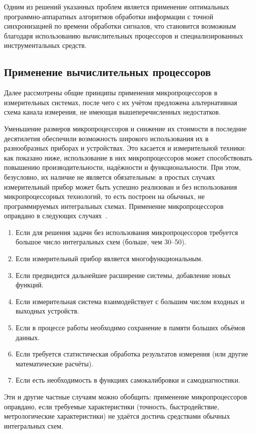 \documentclass[a4paper, 14pt, titlepage]{extarticle}
\begin{document}
  Одним из решений указанных проблем является применение оптимальных программно-аппаратных
  алгоритмов обработки информации с точной синхронизацией по времени  обработки сигналов,
  что становится возможным благодаря использованию вычислительных процессоров и специализированных инструментальных средств.

  \subsection{Применение вычислительных процессоров}

  Далее рассмотрены общие принципы применения микропроцессоров в измерительных системах, после чего
  с их учётом предложена альтернативная схема канала измерения, не имеющая вышеперечисленных недостатков.

  Уменьшение размеров микропроцессоров и снижение их стоимости в последние десятилетия обеспечили
  возможность широкого использования их в разнообразных приборах и устройствах. Это касается и
  измерительной техники: как показано ниже, использование в них микропроцессоров может
  способствовать повышению производительности, надёжности и функциональности. При этом, безусловно,
  их наличие не является обязательным: в простых случаях измерительный прибор может быть успешно реализован
  и без использования микропроцессорных технологий, то есть построен на обычных, не программируемых
  интегральных схемах. Применение микропроцессоров оправдано в следующих случаях~\cite[с.~241]{rannev-meas-tech}.
  \begin{enumerate}
    \item Если для решения задачи без использования микропроцессоров требуется большое число интегральных
      схем (больше, чем 30--50).
    \item Если измерительный прибор является многофункциональным.
    \item Если предвидится дальнейшее расширение системы, добавление новых функций.
    \item Если измерительная система взаимодействует с большим числом входных и выходных устройств.
    \item Если в процессе работы необходимо сохранение в памяти больших объёмов данных.
    \item Если требуется статистическая обработка результатов измерения (или другие математические расчёты).
    \item Если есть необходимость в функциях самокалибровки и самодиагностики.
  \end{enumerate}
  Эти и другие частные случаям можно обобщить: применение микропроцессоров оправдано, если требуемые
  характеристики (точность, быстродействие, метрологические характеристики) не удаётся достичь
  средствами обычных интегральных схем.
\end{document}
